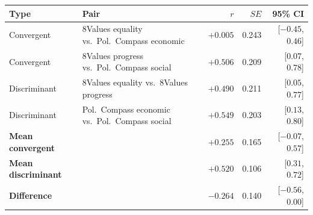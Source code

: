 \begin{tabular}{lp{6.4cm}rrr}
\toprule
Type & Pair & $r$ & $SE$ & 95\% CI \\
\midrule
Convergent & 8Values equality vs.\ Pol.\ Compass economic & $+0.005$ & 0.243 & [$-0.45$, $0.46$] \\
Convergent & 8Values progress vs.\ Pol.\ Compass social & $+0.506$ & 0.209 & [$0.07$, $0.78$] \\
Discriminant & 8Values equality vs.\ 8Values progress & $+0.490$ & 0.211 & [$0.05$, $0.77$] \\
Discriminant & Pol.\ Compass economic vs.\ Pol.\ Compass social & $+0.549$ & 0.203 & [$0.13$, $0.80$] \\
\midrule
\textbf{Mean convergent} & & $+0.255$ & 0.165 & [$-0.07$, $0.57$] \\
\textbf{Mean discriminant} & & $+0.520$ & 0.106 & [$0.31$, $0.72$] \\
\textbf{Difference} & & $-0.264$ & 0.140 & [$-0.56$, $0.00$] \\
\bottomrule
\end{tabular}
